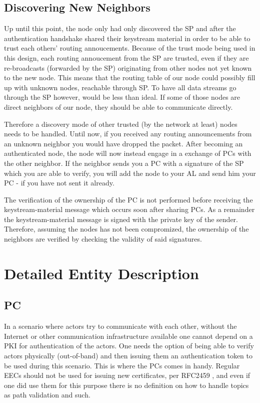 \subsection{Discovering New Neighbors}
Up until this point, the node only had only discovered the \ac{SP} and after the
authentication handshake shared their keystream material in order to be able to
trust each others' routing annoucements. Because of the trust mode being used in
this design, each routing annoucement from the \ac{SP} are trusted, even if they
are re-broadcasts (forwarded by the SP) originating from other nodes not yet
known to the new node. This means that the routing table of our node could
possibly fill up with unknown nodes, reachable through \ac{SP}. To have all
data streams go through the \ac{SP} however, would be less than ideal. If some
of those nodes are direct neighbors of our node, they should be able to
communicate directly.

Therefore a discovery mode of other trusted (by the network at least) nodes
needs to be handled. Until now, if you received any routing announcements
from an unknown neighbor you would have dropped the packet. After becoming an
authenticated node, the node will now instead engage in a exchange of \acp{PC}
with the other neighbor. If the neighbor sends you a \ac{PC} with a signature
of the \ac{SP} which you are able to verify, you will add the node to your
\ac{AL} and send him your \ac{PC} - if you have not sent it already.

The verification of the ownership of the \ac{PC} is not performed before
receiving the keystream-material message which occurs soon after sharing
\acp{PC}. As a remainder the keystream-material message is signed with the
private key of the sender. Therefore, assuming the nodes has not been
compromized, the ownership of the neighbors are verified by checking the
validity of said signatures.

\section{Detailed Entity Description}
\label{sect:detailed_ent}
\subsection{\acf{PC}}
\label{subsect:detailed_pc_descr}
In a scenario where actors try to communicate with each other, without the
Internet or other communication infrastructure available one cannot depend on a
\ac{PKI} for authentication of the actors. One needs the option of being able
to verify actors physically (out-of-band) and then issuing them an
authentication token to be used during this scenario. This is where the
\aclp{PC} comes in handy. Regular \acp{EEC} should not be used for issuing new
certificates, per RFC2459 \cite{rfc2459}, and even if one did use them for
this purpose there is no definition on how to handle topics as path validation
and such.

